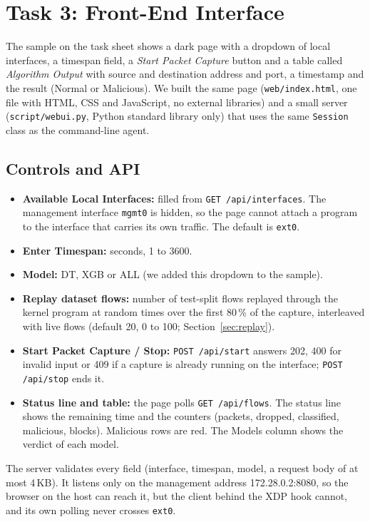 \chapter{Task 3: Front-End Interface}\label{chap:task3}

The sample on the task sheet shows a dark page with a dropdown of local interfaces, a timespan field, a \emph{Start Packet Capture} button and a table called \emph{Algorithm Output} with source and destination address and port, a timestamp and the result (Normal or Malicious). We built the same page (\texttt{web/index.html}, one file with HTML, CSS and JavaScript, no external libraries) and a small server (\texttt{script/webui.py}, Python standard library only) that uses the same \texttt{Session} class as the command-line agent.

\section{Controls and API}
\begin{itemize}\setlength\itemsep{0pt}
	\item \textbf{Available Local Interfaces:} filled from \texttt{GET /api/interfaces}. The management interface \texttt{mgmt0} is hidden, so the page cannot attach a program to the interface that carries its own traffic. The default is \texttt{ext0}.
	\item \textbf{Enter Timespan:} seconds, 1 to 3600.
	\item \textbf{Model:} DT, XGB or ALL (we added this dropdown to the sample).
	\item \textbf{Replay dataset flows:} number of test-split flows replayed through the kernel program at random times over the first 80\,\% of the capture, interleaved with live flows (default 20, 0 to 100; Section~\ref{sec:replay}).
	\item \textbf{Start Packet Capture / Stop:} \texttt{POST /api/start} answers 202, 400 for invalid input or 409 if a capture is already running on the interface; \texttt{POST /api/stop} ends it.
	\item \textbf{Status line and table:} the page polls \texttt{GET /api/flows}. The status line shows the remaining time and the counters (packets, dropped, classified, malicious, blocks). Malicious rows are red. The Models column shows the verdict of each model.
\end{itemize}
The server validates every field (interface, timespan, model, a request body of at most 4\,KB). It listens only on the management address 172.28.0.2:8080, so the browser on the host can reach it, but the client behind the XDP hook cannot, and its own polling never crosses \texttt{ext0}.

